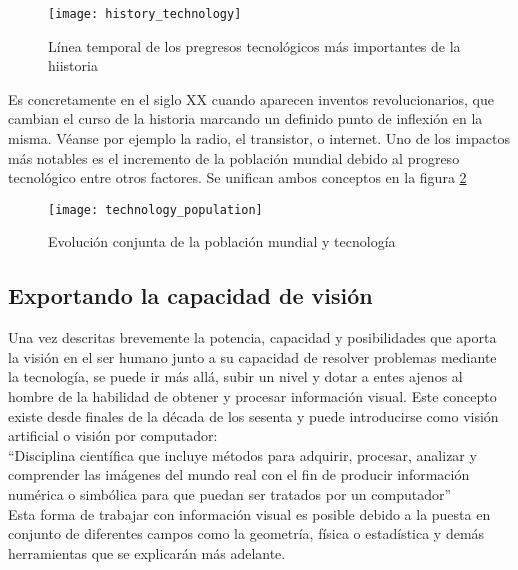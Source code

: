 \begin{figure}[!htb]
\centering
{}
  \texttt{[image: history\_technology]}
  \caption{Línea temporal de los pregresos tecnológicos más importantes de la hiistoria}\label{fig:history_technology}
\endminipage\hfill
\end{figure}

Es concretamente en el siglo XX cuando aparecen inventos revolucionarios, que cambian el curso de la historia marcando un definido punto de inflexión en la misma. Véanse por ejemplo la radio, el transistor, o internet. Uno de los impactos más notables es el incremento de la población mundial debido al progreso tecnológico entre otros factores. Se unifican ambos conceptos en la figura \ref{fig:technology_population}

\begin{figure}[!htb]
\centering
{}
  \texttt{[image: technology\_population]}
  \caption{Evolución conjunta de la población mundial y tecnología}\label{fig:technology_population}
\endminipage\hfill
\end{figure}

\subsection{Exportando la capacidad de visión}

Una vez descritas brevemente la potencia, capacidad y posibilidades que aporta la visión en el ser humano junto a su capacidad de resolver problemas mediante la tecnología, se puede ir más allá, subir un nivel y dotar a entes ajenos al hombre de la habilidad de obtener y procesar información visual. Este concepto existe desde finales de la década de los sesenta y puede introducirse como visión artificial o visión por computador\cite{vision_artificial}:
\\
“Disciplina científica que incluye métodos para adquirir, procesar, analizar y comprender las imágenes del mundo real con el fin de producir información numérica o simbólica para que puedan ser tratados por un computador”
\\
Esta forma de trabajar con información visual es posible debido a la puesta en conjunto de diferentes campos como la geometría, física o estadística y demás herramientas que se explicarán más adelante.

